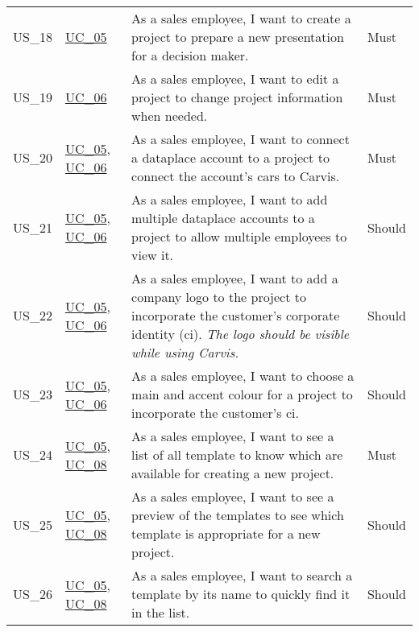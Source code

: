 \begin{footnotesize}
\begin{longtable}[L L L L]{ p{} p{} p{} p{} }
      \hypertarget{Ref:US18}{US\_18} & \hyperlink{Ref:UC5}{UC\_05} & As a sales employee, I want to create a project to prepare a new presentation for a decision maker. & Must \\
      \hypertarget{Ref:US19}{US\_19} & \hyperlink{Ref:UC6}{UC\_06} & As a sales employee, I want to edit a project to change project information when needed. & Must \\
      \hypertarget{Ref:US20}{US\_20} & \hyperlink{Ref:UC5}{UC\_05}, \newline \hyperlink{Ref:UC6}{UC\_06} & As a sales employee, I want to connect a \gls{dataplace} account to a project to connect the account's cars to Carvis. & Must \\
      \hypertarget{Ref:US21}{US\_21} & \hyperlink{Ref:UC5}{UC\_05}, \newline \hyperlink{Ref:UC6}{UC\_06} & As a sales employee, I want to add multiple \gls{dataplace} accounts to a project to allow multiple employees to view it. & Should \\
      \hypertarget{Ref:US22}{US\_22} & \hyperlink{Ref:UC5}{UC\_05}, \newline \hyperlink{Ref:UC6}{UC\_06} & As a sales employee, I want to add a company logo to the project to incorporate the customer's corporate identity (\gls{ci}). 
      \newline
      \emph{The logo should be visible while using Carvis.} & Should
      \\
      \hypertarget{Ref:US23}{US\_23} & \hyperlink{Ref:UC5}{UC\_05}, \newline \hyperlink{Ref:UC6}{UC\_06} & As a sales employee, I want to choose a main and accent colour for a project to incorporate the customer's \gls{ci}. & Should \\
      \hypertarget{Ref:US24}{US\_24} & \hyperlink{Ref:UC5}{UC\_05}, \newline \hyperlink{Ref:UC8}{UC\_08} & As a sales employee, I want to see a list of all template to know which are available for creating a new project. & Must \\
      \hypertarget{Ref:US25}{US\_25} & \hyperlink{Ref:UC5}{UC\_05}, \newline \hyperlink{Ref:UC8}{UC\_08} & As a sales employee, I want to see a preview of the templates to see which template is appropriate for a new project. & Should \\
      \hypertarget{Ref:US26}{US\_26} & \hyperlink{Ref:UC5}{UC\_05}, \newline \hyperlink{Ref:UC8}{UC\_08} & As a sales employee, I want to search a template by its name to quickly find it in the list. & Should \\

\end{longtable}
\end{footnotesize}

